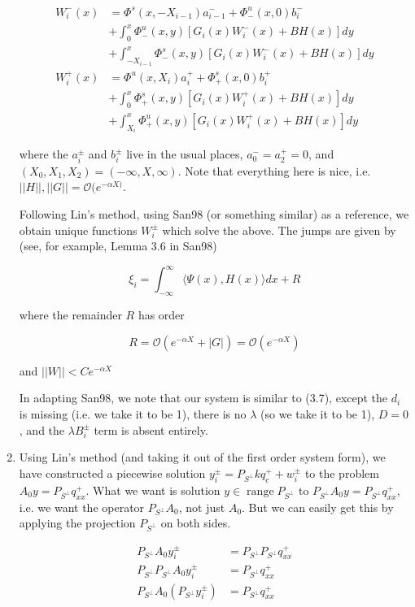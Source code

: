 \documentclass[12pt]{article}
\DeclareMathOperator{\ran}{range}
\begin{document}
\begin{enumerate}
\begin{align*}
W_i^-(x) &= \Phi^s(x, -X_{i-1})a_{i-1}^- + \Phi^u_-(x, 0)b_i^- \\
&+ \int_{0}^x \Phi^u_-(x, y)[G_i(x) W_i^-(x)+ B H(x)] dy \\
&+ \int_{-X_{i-1}}^x \Phi^s_-(x, y)[G_i(x) W_i^-(x)+ B H(x) ] dy \\
W_i^+(x) &= \Phi^u(x, X_i)a_i^+ + \Phi^s_+(x, 0)b_i^+ \\
&+ \int_{0}^x \Phi^s_+(x, y)[G_i(x) W_i^+(x)+ B H(x) ] dy \\
&+ \int_{X_i}^x \Phi^u_+(x, y)[G_i(x) W_i^+(x)+ B H(x) ] dy
\end{align*}

where the $a_i^\pm$ and $b_i^\pm$ live in the usual places, $a_0^- = a_2^+ = 0$, and $(X_0, X_1, X_2) = (-\infty, X, \infty)$. Note that everything here is nice, i.e. $||H||, ||G|| = \mathcal{O}(e^{-\alpha X)}$.

Following Lin's method, using San98 (or something similar) as a reference, we obtain unique functions $W_i^\pm$ which solve the above. The jumps are given by (see, for example, Lemma 3.6 in San98)

\begin{equation}
\xi_i = \int_{-\infty}^\infty \langle \Psi(x), H(x) \rangle dx + R
\end{equation}

where the remainder $R$ has order

\[
R = \mathcal{O}(e^{-\alpha X} + |G|) = \mathcal{O}(e^{-\alpha X}) 
\]

and $||W|| < C e^{-\alpha X}$

In adapting San98, we note that our system is similar to (3.7), except the $d_i$ is missing (i.e. we take it to be 1), there is no $\lambda$ (so we take it to be 1), $D = 0$, and the $\lambda B_i^\pm$ term is absent entirely.

\item Using Lin's method (and taking it out of the first order system form), we have constructed a piecewise solution $y_i^\pm = P_{S^\perp} k q^+_c + w_i^\pm$ to the problem $A_0 y = P_{S^\perp} q^+_{xx}$. What we want is solution $y \in \ran P_{S^\perp}$ to $P_{S^\perp} A_0 y = P_{S^\perp} q^+_{xx}$, i.e. we want the operator $P_{S^\perp} A_0$, not just $A_0$. But we can easily get this by applying the projection $P_{S^\perp}$ on both sides.

\begin{align*}
P_{S^\perp} A_0 y_i^\pm &= P_{S^\perp} P_{S^\perp} q^+_{xx} \\
P_{S^\perp} P_{S^\perp} A_0 y_i^\pm &= P_{S^\perp} q^+_{xx} \\
P_{S^\perp} A_0 (P_{S^\perp} y_i^\pm) &= P_{S^\perp} q^+_{xx}
\end{align*}


\end{enumerate}
\end{document}
